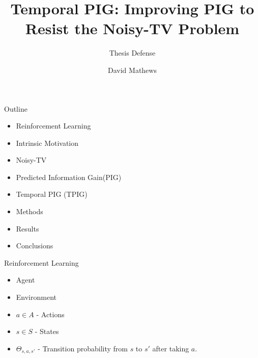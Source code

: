 

\title{Temporal PIG: Improving PIG to Resist the Noisy-TV Problem}
\subtitle{Thesis Defense}
\author{David Mathews}




\usepackage{bm}
\usepackage{amsmath}
\usepackage{array}
\usepackage{subfigure}
\setlength{\extrarowheight}{2pt}

\newcommand{\real}{\mathbb{R}}
\newcommand{\norm}[1]{\left\lVert#1\right\rVert}

\usepackage{calligra}
\usepackage{hyperref}

\DeclareMathOperator*{\argmax}{arg\,max}


	
	\begin{frame}{}
		\maketitle
	\end{frame}
	
	
	\begin{frame}[fragile]{Outline}
		\begin{itemize}
			\item {Reinforcement Learning}
			\item {Intrinsic Motivation}
			\item {Noisy-TV}
			\item {Predicted Information Gain(PIG)}
			\item {Temporal PIG (TPIG)}
			\item {Methods}
			\item {Results}
			\item {Conclusions}
		\end{itemize}
	\end{frame}
	
	
	\begin{frame}[fragile]{Reinforcement Learning}
		\begin{itemize}
			\item {Agent}
			\item {Environment}
			\item {$a \in A$ - Actions}
			\item {$s \in S$ - States}
			\item { $\Theta_{s,a,s'}$ - Transition probability from $s$ to $s'$ after taking $a$.}
		\end{itemize}
	\end{frame}
	
